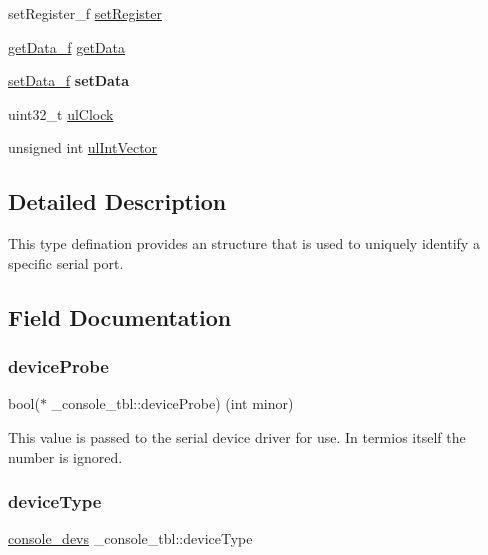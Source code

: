 \begin{DoxyCompactItemize}
\item 
set\+Register\+\_\+f \mbox{\hyperlink{struct__console__tbl_a134f051c4f122ef709d302656dd508f8}{set\+Register}}
\item 
\mbox{\hyperlink{serial_8h_a8b3da3714b7a892e4498566118046feb}{get\+Data\+\_\+f}} \mbox{\hyperlink{struct__console__tbl_a87e50fb89c7f3538e362af8414c58d5f}{get\+Data}}
\item 
\mbox{\label{struct__console__tbl_a1e3dfe72d4c990fc6450af1ca61853bb}} 
\mbox{\hyperlink{serial_8h_aedca9408a278c203c91f9498bec05076}{set\+Data\+\_\+f}} {\bfseries set\+Data}
\item 
uint32\+\_\+t \mbox{\hyperlink{struct__console__tbl_a06aee31d1ddb05ff9c18ca084684a482}{ul\+Clock}}
\item 
unsigned int \mbox{\hyperlink{struct__console__tbl_a3b5873934764edfdd97588457344dded}{ul\+Int\+Vector}}
\end{DoxyCompactItemize}


\subsection{Detailed Description}
This type defination provides an structure that is used to uniquely identify a specific serial port. 

\subsection{Field Documentation}
\mbox{\label{struct__console__tbl_a6eb286b8e6770796a6220de81360b753}} 
\subsubsection{\texorpdfstring{deviceProbe}{deviceProbe}}
{\footnotesize\ttfamily bool($\ast$ \+\_\+console\+\_\+tbl\+::device\+Probe) (int minor)}

This value is passed to the serial device driver for use. In termios itself the number is ignored. \mbox{\label{struct__console__tbl_ab8c929a8444f2de9cec121db8dac7a1f}} 
\subsubsection{\texorpdfstring{deviceType}{deviceType}}
{\footnotesize\ttfamily \mbox{\hyperlink{serial_8h_a0450b2dba111c72a0316ed1912aeda71}{console\+\_\+devs}} \+\_\+console\+\_\+tbl\+::device\+Type}

